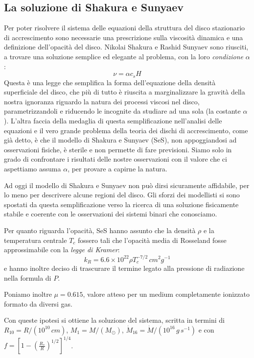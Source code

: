 \documentclass[a4paperbi]{article}
\begin{document}
\subsection{La soluzione di Shakura e Sunyaev}
	Per poter risolvere il sistema delle equazioni della struttura del disco stazionario di accrescimento sono necessarie una prescrizione sulla viscosità dinamica e una definizione dell'opacità del disco. Nikolai Shakura e Rashid Sunyaev sono riusciti, a trovare una soluzione semplice ed elegante al problema, con la loro \textit{condizione} $\alpha$:
	\begin{equation}
		\nu=\alpha c_sH
	\end{equation}
Questa è una legge che semplifica la forma dell'equazione della densità superficiale del disco, che più di tutto è riuscita a marginalizzare la gravità della nostra ignoranza riguardo la natura dei processi viscosi nel disco, parametrizzandoli e riducendo le incognite da studiare ad una sola (la costante $\alpha$). L'altra faccia della medaglia di questa semplificazione nell'analisi delle equazioni e il vero grande problema della teoria dei dischi di accrescimento, come già detto, è che il modello di Shakura e Sunyaev (SeS), non appoggiandosi ad osservazioni fisiche, è sterile e non permette di fare previsioni. Siamo solo in grado di confrontare i risultati delle nostre osservazioni con il valore che ci aspettiamo assuma $\alpha$, per provare a capirne la natura.

Ad oggi il modello di Shakura e Sunyaev non può dirsi sicuramente affidabile, per lo meno per descrivere alcune regioni del disco. Gli sforzi dei modellisti si sono spostati da questa semplificazione verso la ricerca di una soluzione fisicamente stabile e coerente con le osservazioni dei sistemi binari che conosciamo.

Per quanto riguarda l'opacità, SeS hanno assunto che la densità $\rho$ e la temperatura centrale $T_c$ fossero tali che l'opacità media di Rosseland fosse approssimabile con la \textit{legge di Kramer}:
\begin{equation}
	k_R=6.6\times10^{22}\rho T_c^{-7/2}\,cm^2g^{-1}
\end{equation}
e hanno inoltre deciso di trascurare il termine legato alla pressione di radiazione nella formula di $P$.

Poniamo inoltre $\mu=0.615$, valore atteso per un medium completamente ionizzato formato da diversi gas. 

Con queste ipotesi si ottiene la soluzione del sistema, scritta in termini di $R_{10}=R/(10^{10}\,cm)$, $M_{1}=M/(M_\odot)$, $\dot{M}_{16}=\dot{M}/(10^{16}\,g\,s^{-1})$ e con $f=\left[1-\left(\frac{R_*}{R}\right)^{1/2}\right]^{1/4}$. 
\end{document}
